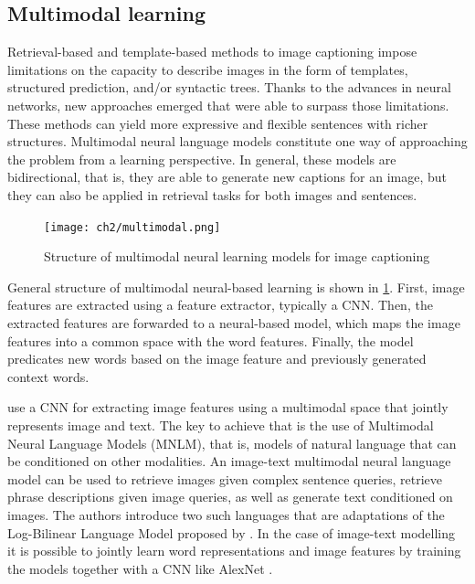 \subsection{Multimodal learning}\label{subsec:multimodal-learning}

Retrieval-based and template-based methods to image captioning impose limitations on the capacity to describe images in the form of templates, structured prediction, and/or syntactic trees. Thanks to the advances in neural networks, new approaches emerged that were able to surpass those limitations. These methods can yield more expressive and flexible sentences with richer structures.  Multimodal neural language models constitute one way of approaching the problem from a learning perspective. In general, these models are bidirectional, that is, they are able to generate new captions for an image, but they can also be applied in retrieval tasks for both images and sentences.

\begin{figure}[hpt]
	\centering
	\texttt{[image: ch2/multimodal.png]}
	\caption{Structure of multimodal neural learning models for image captioning}
	\label{fig:multimodal}
\end{figure}

General structure of multimodal neural-based learning is shown in \cref{fig:multimodal}. First, image features are extracted using a feature extractor, typically a CNN. Then, the extracted features are forwarded to a neural-based model, which maps the image features into a common space with the word features. Finally, the model predicates new words based on the image feature and previously generated context words.

\citet{Kiros2014_VS} use a CNN for extracting image features using a multimodal space that jointly represents image and text. The key to achieve that is the use of Multimodal Neural Language Models (MNLM), that is, models of natural language that can be conditioned on other modalities. An image-text multimodal neural language model can be used to retrieve images given complex sentence queries, retrieve phrase descriptions given image queries, as well as generate text conditioned on images. The authors introduce two such languages that are adaptations of the Log-Bilinear Language Model proposed by \citet{Mnih2007}. In the case of image-text modelling it is possible to jointly learn word representations and image features by training the models together with a CNN like AlexNet \citep{Krizhevsky2012}.

